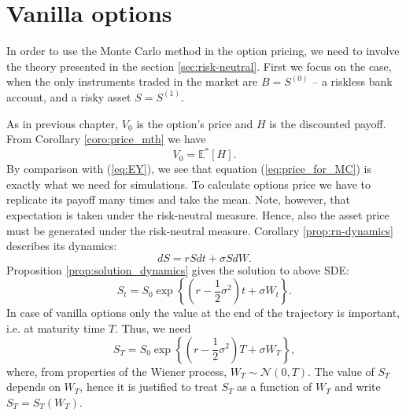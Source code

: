 \documentclass[a4paper,11pt, twoside]{book}
\theoremstyle{definition}
\theoremstyle{remark}
\def\Em{{\mathbb{E}^*}}
\begin{document}
\section{Vanilla options}
\label{sec:pricing_vanilla}

In order to use the Monte Carlo method in the option pricing, we need to involve the theory presented in the section \ref{sec:risk-neutral}. First we focus on the case, when the only instruments traded in the market are $B = S^{(0)}$ -- a riskless bank account, and a risky asset $S = S^{(1)}$.

As in previous chapter, $V_0$ is the option's price and $H$ is the discounted payoff. From Corollary \ref{coro:price_mth} we have
\begin{equation}
 \label{eq:price_for_MC}
 V_0 = \Em[H].
\end{equation}
By comparison with (\ref{eq:EY}), we see that equation (\ref{eq:price_for_MC}) is exactly what we need for simulations. To calculate options price we have to replicate its payoff many times and take the mean. Note, however, that expectation is taken under the risk-neutral measure. Hence, also the asset price must be generated under the risk-neutral measure. Corollary \ref{prop:rn-dynamics} describes its dynamics:
\[ dS = rSdt + \sigma S dW. \]
Proposition \ref{prop:solution_dynamics} gives the solution to above SDE:
\begin{equation}
 \label{eq:vanilla_St}
 S_t = S_0 \exp\left\{ (r - \frac{1}{2}\sigma^2)t + \sigma W_t \right\}.
\end{equation}
In case of vanilla options only the value at the end of the trajectory is important, i.e. at maturity time $T$. Thus, we need
\begin{equation}
\label{eq:vanilla_ST}
 S_T = S_0 \exp\left\{ (r - \frac{1}{2}\sigma^2)T + \sigma W_T \right\},
\end{equation}
where, from properties of the Wiener process, $W_T \sim \mathcal{N}(0,T)$. The value of $S_T$ depends on $W_T$, hence it is justified to treat $S_T$ as a function of $W_T$ and write $S_T = S_T(W_T)$.
\end{document}

